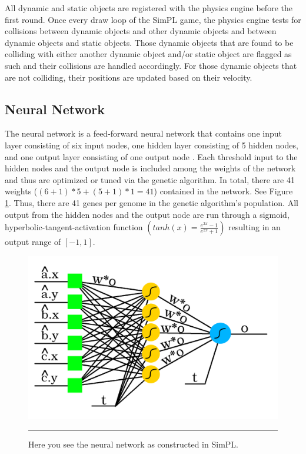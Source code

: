 All dynamic and static objects are registered with the physics engine before the first round. Once every draw loop of the SimPL game, the physics engine tests for collisions between dynamic objects and other dynamic objects and between dynamic objects and static objects. Those dynamic objects that are found to be colliding with either another dynamic object and/or static object are flagged as such and their collisions are handled accordingly. For those dynamic objects that are not colliding, their positions are updated based on their velocity.

\subsection{Neural Network}

The neural network is a feed-forward neural network that contains one input layer consisting of six input nodes, one hidden layer consisting of 5 hidden nodes, and one output layer consisting of one output node \cite{neuralnetworks}. Each threshold input to the hidden nodes and the output node is included among the weights of the network and thus are optimized or tuned via the genetic algorithm. In total, there are 41 weights ($(6+1)*5+(5+1)*1=41$) contained in the network. See Figure \ref{fig:nn}. Thus, there are 41 genes per genome in the genetic algorithm's population. All output from the hidden nodes and the output node are run through a sigmoid, hyperbolic-tangent-activation function $\left ( tanh(x)=\frac{e^{2x}-1}{e^{2x}+1} \right )$ resulting in an output range of $[-1,1]$.

\begin{figure}[htbp]  
  \centering
  \includegraphics[scale=0.34]{../Figures/Chapter3/nn.png}
  \rule{35em}{0.5pt}
  \caption[SimPL NN]{Here you see the neural network as constructed in SimPL.}
  \label{fig:nn}
\end{figure}

